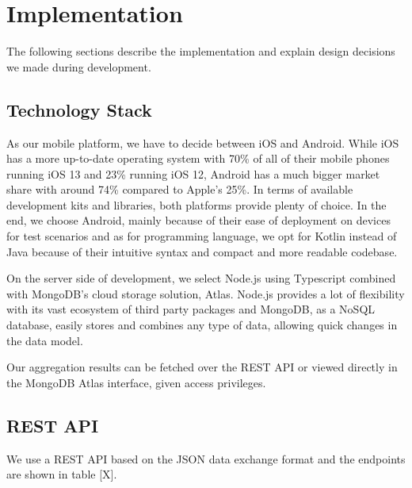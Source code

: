 
\chapter{Implementation}\label{chapter:implementation}

The following sections describe the implementation and explain design decisions we made during development. 

\section{Technology Stack}

As our mobile platform, we have to decide between iOS and Android. While iOS has a more up-to-date operating system with 70\% of all of their mobile phones running iOS 13 and 23\% running iOS 12, Android has a much bigger market share with around 74\% compared to Apple's 25\%. 
In terms of available development kits and libraries, both platforms provide plenty of choice. In the end, we choose Android, mainly because of their ease of deployment on devices for test scenarios and as for programming language, we opt for Kotlin instead of Java because of their intuitive syntax and compact and more readable codebase.

On the server side of development, we select Node.js using Typescript combined with MongoDB's cloud storage solution, Atlas. Node.js provides a lot of flexibility with its vast ecosystem of third party packages and MongoDB, as a NoSQL database, easily stores and combines any type of data, allowing quick changes in the data model.


Our aggregation results can be fetched over the REST API or viewed directly in the MongoDB Atlas interface, given access privileges.

\section{REST API}
We use a REST API based on the JSON data exchange format and the endpoints are shown in table [X].

